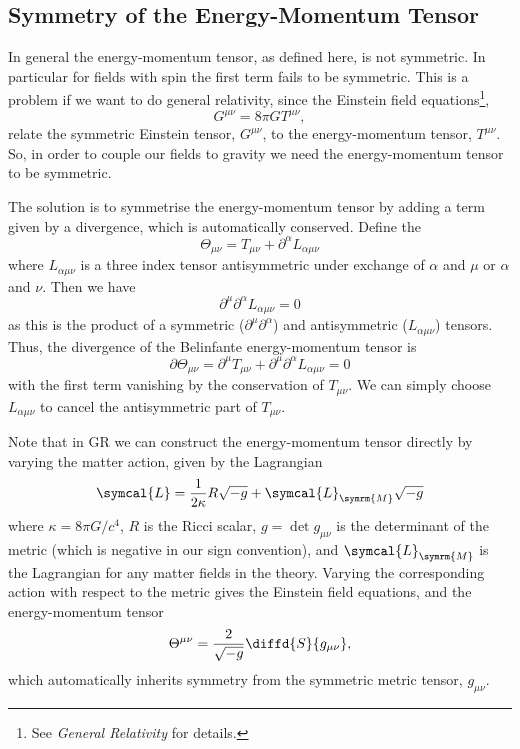 \documentclass[fleqn]{NotesClass}
\newcommand{\course}[1]{\textit{#1}}
\newcommand{\lagrangianDensity}{\symcal{L}}
\begin{document}
    \subsection{Symmetry of the Energy-Momentum Tensor}
    In general the energy-momentum tensor, as defined here, is not symmetric.
    In particular for fields with spin the first term fails to be symmetric.
    This is a problem if we want to do general relativity, since the Einstein field equations\footnote{See \course{General Relativity} for details.},
    \begin{equation}
        G^{\mu\nu} = 8\pi G T^{\mu\nu},
    \end{equation}
    relate the symmetric Einstein tensor, \(G^{\mu\nu}\), to the energy-momentum tensor, \(T^{\mu\nu}\).
    So, in order to couple our fields to gravity we need the energy-momentum tensor to be symmetric.
    
    The solution is to symmetrise the energy-momentum tensor by adding a term given by a divergence, which is automatically conserved.
    Define the 
    \begin{equation}
        \Theta_{\mu\nu} = T_{\mu\nu} + \partial^\alpha L_{\alpha\mu\nu}
    \end{equation}
    where \(L_{\alpha\mu\nu}\) is a three index tensor antisymmetric under exchange of \(\alpha\) and \(\mu\) or \(\alpha\) and \(\nu\).
    Then we have
    \begin{equation}
        \partial^\mu \partial^\alpha L_{\alpha\mu\nu} = 0
    \end{equation}
    as this is the product of a symmetric (\(\partial^\mu \partial^\alpha\)) and antisymmetric (\(L_{\alpha\mu\nu}\)) tensors.
    Thus, the divergence of the Belinfante energy-momentum tensor is
    \begin{equation}
        \partial \Theta_{\mu\nu} = \partial^\mu T_{\mu\nu} + \partial^\mu \partial^\alpha L_{\alpha\mu\nu} = 0
    \end{equation}
    with the first term vanishing by the conservation of \(T_{\mu\nu}\).
    We can simply choose \(L_{\alpha\mu\nu}\) to cancel the antisymmetric part of \(T_{\mu\nu}\).
    
    Note that in GR we can construct the energy-momentum tensor directly by varying the matter action, given by the Lagrangian
    \begin{equation}
        \lagrangianDensity = \frac{1}{2\kappa} R \sqrt{-g} + \lagrangianDensity_{\symrm{M}} \sqrt{-g}
    \end{equation}
    where \(\kappa = 8\pi G/c^4\), \(R\) is the Ricci scalar, \(g = \det g_{\mu\nu}\) is the determinant of the metric (which is negative in our sign convention), and \(\lagrangianDensity_{\symrm{M}}\) is the Lagrangian for any matter fields in the theory.
    Varying the corresponding action with respect to the metric gives the Einstein field equations, and the energy-momentum tensor
    \begin{equation}
        \Theta^{\mu\nu} = \frac{2}{\sqrt{-g}} \diffd{S}{g_{\mu\nu}},
    \end{equation}
    which automatically inherits symmetry from the symmetric metric tensor, \(g_{\mu\nu}\).
    
\end{document}
